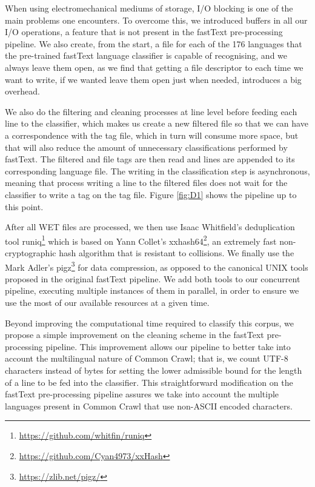 When using electromechanical mediums of storage, I/O blocking is one of the main problems one encounters. To overcome this, we introduced buffers in all our I/O operations, a feature that is not present in the fastText pre-processing pipeline. We also create, from the start, a file for each of the 176 languages that the pre-trained fastText language classifier is capable of recognising, and we always leave them open, as we find that getting a file descriptor to each time we want to write, if we wanted leave them open just when needed, introduces a big overhead.

We also do the filtering and cleaning processes at line level before feeding each line to the classifier, which makes us create a new filtered file so that we can have a correspondence with the tag file, which in turn will consume more space, but that will also reduce the amount of unnecessary classifications performed by fastText. The filtered and file tags are then read and lines are appended to its corresponding language file. The writing in the classification step is asynchronous, meaning that process writing a line to the filtered files does not wait for the classifier to write a tag on the tag file. Figure \ref{fig:D1} shows the pipeline up to this point.

After all WET files are processed, we then use Isaac Whitfield's deduplication tool runiq\footnote{\url{https://github.com/whitfin/runiq}} which is based on Yann Collet's xxhash64\footnote{\url{https://github.com/Cyan4973/xxHash}}, an extremely fast non-cryptographic hash algorithm that is resistant to collisions. We finally use the Mark Adler's pigz\footnote{\url{https://zlib.net/pigz/}} for data compression, as opposed to the canonical UNIX tools proposed in the original fastText pipeline. We add both tools to our concurrent pipeline, executing multiple instances of them in parallel, in order to ensure we use the most of our available resources at a given time.

Beyond improving the computational time required to classify this corpus, we propose a simple improvement on the cleaning scheme in the fastText pre-processing pipeline. This improvement allows our pipeline to better take into account the multilingual nature of Common Crawl; that is, we count UTF-8 characters instead of bytes for setting the lower admissible bound for the length of a line to be fed into the classifier. This straightforward modification on the fastText pre-processing pipeline assures we take into account the multiple languages present in Common Crawl that use non-ASCII encoded characters.


